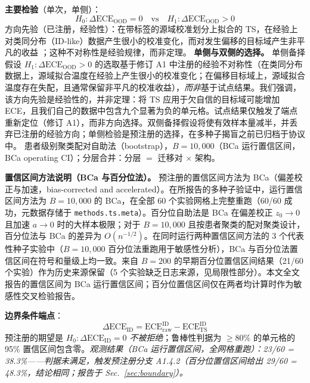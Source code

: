 \textbf{主要检验}（单次，单侧）：
\begin{equation}
    H_0: \Delta\text{ECE}_{\text{OOD}} = 0
    \quad\text{vs}\quad
    H_1: \Delta\text{ECE}_{\text{OOD}} > 0
\end{equation}
方向先验（已注册，经验性）：在带标签的源域校准划分上拟合的 TS，在经验上对类同分布（ID-like）数据产生很小的校准变化，而对发生偏移的目标域产生非平凡的收益 \cite{guo2017calibration,ovadia2019calibration}；这种不对称性是经验规律，而非定理。
\textbf{单侧与双侧的选择。} 单侧备择假设 $H_1: \Delta\text{ECE}_{\text{OOD}} > 0$ 的选取基于修订 A1 中注册的经验不对称性（在类同分布数据上，源域拟合温度在经验上产生很小的校准变化；在偏移目标域上，源域拟合温度存在失配，且通常保留非平凡的校准收益），\emph{而非}基于试点结果。我们强调，该方向先验是经验性的，并非定理：将 TS 应用于欠自信的目标域可能增加 ECE，且我们自己的数据中包含九个显著为负的单元格。试点结果仅触发了端点重新定位（修订 A1），而非方向选择。双侧备择假设将使有效样本量减半，并丢弃已注册的经验方向；单侧检验是预注册的选择，在多种子揭盲之前已归档于协议中。
患者级别聚类配对自助法（bootstrap），$B=10{,}000$（BCa 运行置信区间，BCa operating CI）\cite{efron1987bca}；分层合并：分层 $=$ 迁移对 $\times$ 架构。

\textbf{置信区间方法说明（BCa 与百分位法）。} 预注册的置信区间方法为 BCa（偏差校正与加速，bias-corrected and accelerated）\cite{efron1987bca}。在所报告的多种子验证中，运行置信区间方法为 $B=10{,}000$ 的 BCa，在全部 60 个实验网格上完整重跑（60/60 成功，元数据存储于 \texttt{methods.ts.meta}）。百分位自助法是 BCa 在偏差校正 $z_0\to 0$ 且加速 $a\to 0$ 时的大样本极限；对于 $B=10{,}000$ 且按患者聚类的配对聚类设计，百分位法与 BCa 的差异为 $O(n^{-1/2})$。在同时运行两种置信区间方法的 3 个代表性种子实验中（$B=10{,}000$ 百分位法重跑用于敏感性分析），BCa 与百分位法置信区间在符号和量级上均一致。来自 $B=200$ 的早期百分位置信区间结果（21/60 个实验）作为历史来源保留（5 个实验缺乏日志来源，见局限性部分）。本文全文报告的置信区间为 BCa 运行置信区间；百分位置信区间仅在两者均计算时作为敏感性交叉检验报告。

\textbf{边界条件端点}：
\begin{equation}
    \Delta\text{ECE}_{\text{ID}}
    = \text{ECE}_{\mathrm{raw}}^{\mathrm{ID}} - \text{ECE}_{\mathrm{TS}}^{\mathrm{ID}}
\end{equation}
预注册的期望是 $H_0: \Delta\text{ECE}_{\text{ID}} = 0$ \emph{不被拒绝}；鲁棒性判据为 $\geq 80\%$ 的单元格的 95\% 置信区间包含零。\emph{观测结果（BCa 运行置信区间，全网格重跑）：23/60 = 38.3\%——判据未满足，触发预注册分支 A1.4.2（百分位置信区间给出 29/60 = 48.3\%，结论相同；报告于 Sec.~\ref{sec:boundary}）。}

